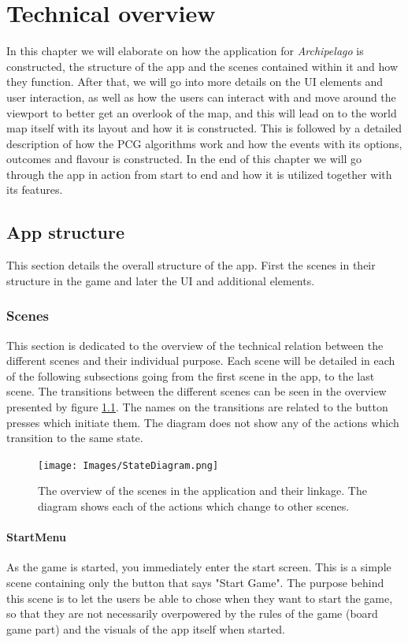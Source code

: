 \chapter{Technical overview}
In this chapter we will elaborate on how the application for \textit{Archipelago} is constructed, the structure of the app and the scenes contained within it and how they function. After that, we will go into more details on the UI elements and user interaction, as well as how the users can interact with and move around the viewport to better get an overlook of the map, and this will lead on to the world map itself with its layout and how it is constructed. This is followed by a detailed description of how the PCG algorithms work and how the events with its options, outcomes and flavour is constructed. In the end of this chapter we will go through the app in action from start to end and how it is utilized together with its features.

\section{App structure}
This section details the overall structure of the app.
First the scenes in their structure in the game and later the UI and additional elements.

\subsection{Scenes}
\label{sec:scen}
This section is dedicated to the overview of the technical relation between the different scenes and their individual purpose. Each scene will be detailed in each of the following subsections going from the first scene in the app, to the last scene.
The transitions between the different scenes can be seen in the overview presented by figure \ref{fig:appState}. The names on the transitions are related to the button presses which initiate them. 
The diagram does not show any of the actions which transition to the same state.

\begin{figure}[!ht]
    \centering
    \texttt{[image: Images/StateDiagram.png]}
    \caption{The overview of the scenes in the application and their linkage. The diagram shows each of the actions which change to other scenes.}
    \label{fig:appState}
\end{figure}

\subsubsection{StartMenu}
As the game is started, you immediately enter the start screen. This is a simple scene containing only the button that says "Start Game". The purpose behind this scene is to let the users be able to chose when they want to start the game, so that they are not necessarily overpowered by the rules of the game (board game part) and the visuals of the app itself when started.

